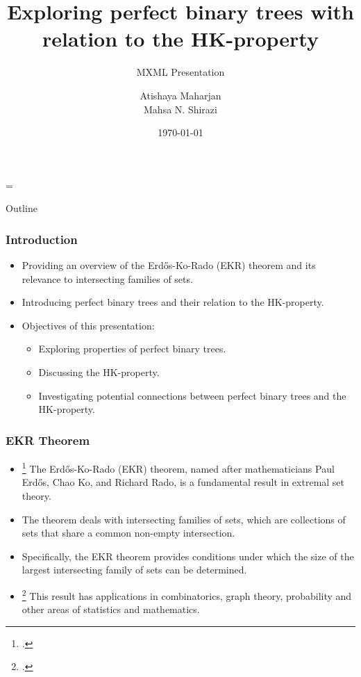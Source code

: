 \documentclass[10pt,]{beamer}
\title[HK-property | Perfect Binary Trees]{Exploring perfect binary trees with relation to the HK-property}
\subtitle{MXML Presentation} %
\author[A.M, M.N.S]{Atishaya Maharjan \\ Mahsa N. Shirazi}
\date{\today}
\theoremstyle{mystyle}
\begin{document}
\parskip = \baselineskip

\begin{frame} %
    \titlepage
\end{frame}

\begin{frame}{Outline}
    \tableofcontents
\end{frame}

\begin{frame}
    \frametitle{Introduction}
    \begin{itemize}
        \item Providing an overview of the Erdős-Ko-Rado (EKR) theorem and its relevance to intersecting families of sets.
        \item Introducing perfect binary trees and their relation to the HK-property.
        \item Objectives of this presentation:
              \begin{itemize}
                  \item Exploring properties of perfect binary trees.
                  \item Discussing the HK-property.
                  \item Investigating potential connections between perfect binary trees and the HK-property.
              \end{itemize}
    \end{itemize}
\end{frame}

\begin{frame}\frametitle{EKR Theorem}
    \begin{itemize}
        \item \footcite{Erds1961INTERSECTIONTF} The Erdős-Ko-Rado (EKR) theorem, named after mathematicians Paul Erdős, Chao Ko, and Richard Rado, is a fundamental result in extremal set theory.
        \item The theorem deals with intersecting families of sets, which are collections of sets that share a common non-empty intersection.
        \item  Specifically, the EKR theorem provides conditions under which the size of the largest intersecting family of sets can be determined.
        \item \footcite{MR0892525} This result has applications in combinatorics, graph theory, probability and other areas of statistics and mathematics.
    \end{itemize}
\end{frame}
\end{document}
